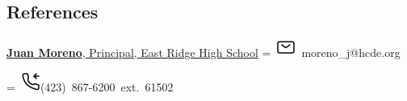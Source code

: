 \documentclass[]{plushcv}
\begin{document}
\begin{paracol}{2}

\section{References} 
\href{https://www.linkedin.com/school/east-ridge-high-school-56/}{\textbf{Juan Moreno}, Principal, East Ridge High School}
\begingroup
{}=\hbox{
\includegraphics[scale=0.5,trim={0cm 0.2cm 0cm 0cm}]{icons/main/mail.png}\hspace{0.3cm} moreno\_j@hcde.org
}
\parbox{\wd0}{}
\endgroup
\begingroup
{}=\hbox{
\includegraphics[scale=0.5,trim={0cm 0.2cm 0cm 0cm}]{icons/main/phone-income.png}\hspace{0.3cm}(423) 867-6200 ext. 61502
}
\parbox{\wd0}{}\endgroup
\\






\end{paracol}
\end{document}
